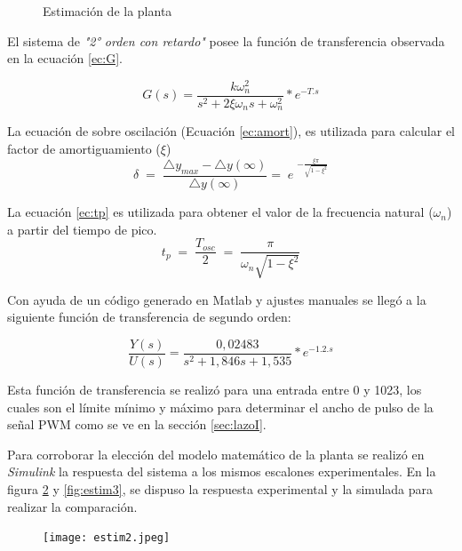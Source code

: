     \begin{figure}[H]
    	\centering
    	\caption{Estimación de la planta} \label{fig:pl2}
    \end{figure}

El sistema de \textit{"2° orden con retardo"} posee la función de transferencia observada en la ecuación \ref{ec:G}.

 \begin{equation}
 	G(s)=\frac{k\omega_n^2}{s^2+2\xi\omega_ns+\omega_n^2}\ast e^{-T.s}
 	\label{ec:G}
 \end{equation}

La ecuación de sobre oscilación (Ecuación \ref{ec:amort}), es utilizada para calcular el factor de amortiguamiento ($\xi$)
\begin{equation}
	\delta\;=\;\frac{\triangle y_{max}-\triangle y\left(\infty\right)}{\triangle y\left(\infty\right)}=\;e\;^{-\frac{\xi\pi}{\sqrt{1-\xi^2}}}
	\label{ec:amort}
\end{equation}

La ecuación \ref{ec:tp} es utilizada para obtener el valor de la frecuencia natural ($\omega_n$) a partir del tiempo de pico.
\begin{equation}
t_p\;=\;\frac{T_{osc}}2\;=\;\frac\pi{\omega_n\sqrt{1-\xi^2}}
\label{ec:tp}
\end{equation}

    
    Con ayuda de un código generado en Matlab y ajustes manuales se llegó a la siguiente función de transferencia de segundo orden:
    
    \begin{equation}
    	\frac{Y(s)}{U(s)}=\frac{0,02483}{s^2+1,846s+1,535}*e^{-1.2.s}
    \end{equation}
   
    Esta función de transferencia se realizó para una entrada entre 0 y 1023, los cuales son el límite mínimo y máximo para determinar el ancho de pulso de la señal PWM como se ve en la sección \ref{sec:lazoI}.
    
    Para corroborar la elección del modelo matemático de la planta se realizó en \textit{Simulink} la respuesta del sistema a los mismos escalones experimentales. En la figura \ref{fig:estim2} y \ref{fig:estim3}, se dispuso la respuesta experimental y la simulada para realizar la comparación.
    
    \begin{figure}[H]
    	\centering
    	\texttt{[image: estim2.jpeg]}
    	\label{fig:estim2}
    \end{figure}

